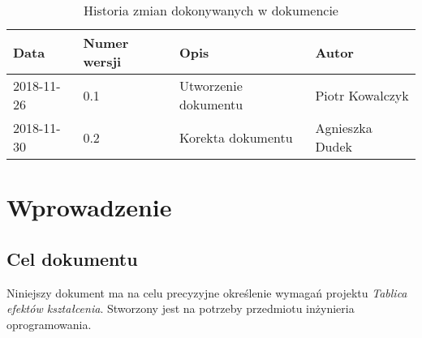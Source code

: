 \documentclass{article}
\begin{document}
\begin{titlepage}






\end{titlepage}

\addtocounter{page}{1}
\newpage

\begin{table}[h!]
	\begin{center}
		\caption{Historia zmian dokonywanych w dokumencie}
		\begin{tabular}{|l|l|l|l|}
			\hline
			Data & Numer wersji & Opis & Autor \\
			\hline \hline
			2018-11-26 & 0.1 & Utworzenie dokumentu & Piotr Kowalczyk \\
			\hline 
			2018-11-30 & 0.2 & Korekta dokumentu & Agnieszka Dudek \\
			\hline
    \end{tabular}
	\end{center}
\end{table}	

\tableofcontents

\newpage


\section{Wprowadzenie}

\subsection{Cel dokumentu}
Niniejszy dokument ma na celu precyzyjne określenie wymagań projektu \textit{Tablica efektów kształcenia}.
Stworzony jest na potrzeby przedmiotu inżynieria oprogramowania.
\end{document}
